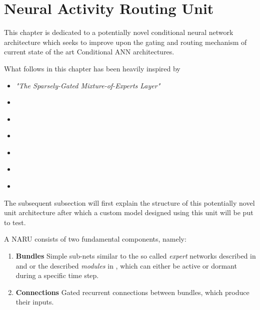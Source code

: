 \clearpage

\chapter{Neural Activity Routing Unit}
This chapter is dedicated to a potentially novel conditional neural network architecture which seeks to
improve upon the gating and routing mechanism of current state of the art Conditional ANN architectures. 

What follows in this chapter has been heavily inspired by

\begin{itemize} 
    \item	 \textit{"The  Sparsely-Gated  Mixture-of-Experts  Layer"} \cite{14_sparsely-gated-experts_2017} 
    \item  \textit{} \cite{24_MoE-eigen2014}
    \item \textit{}   \cite{27_path-net-evolution}
  
    \item \textit{} \cite{11_efficient-CDL_2017}
    
    \item \textit{} \cite{8_CDL-4-efficient_2015}
        
    \item \textit{} \cite{12_dynamic-routing-in-ANNs_2017}
    
    \item \textit{} \cite{15_dynamic-routing-between-capsules_2017}  
    
\end{itemize}

The subsequent subsection will first explain 
the structure of this potentially novel 
unit architecture after which a 
custom model designed using this unit 
will be put to test.

\clearpage

 
A \acf{NARU} consists of two fundamental components, namely: 
 

\begin{enumerate} 
  \item \textbf{Bundles} \linebreak
  Simple sub-nets similar to the so called \textit{expert} networks
  described in \cite{14_sparsely-gated-experts_2017} and \cite{24_MoE-eigen2014} or the described \textit{modules} in \cite{27_path-net-evolution}, which 
  can either be active or dormant during a specific time step.
  
  \item \textbf{Connections} \linebreak
  Gated recurrent connections between bundles, which
  produce their inputs. 
  
\end{enumerate}
 


